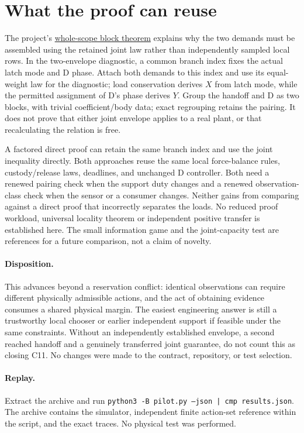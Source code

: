 \documentclass[11pt]{article}
\begin{document}
\section{What the proof can reuse}
The project’s \href{https://github.com/eternal-november/eos-research-programmes/blob/e1348964f73704212d2d8b48d5982a5ed600a2ff/projects/contextual-composition/foundations/shared-world-native-assembly/Whole_Scope_Block_Decomposition.tex\#L47-L60}{whole-scope block theorem} explains why the two demands must be assembled using the retained joint law rather than independently sampled local rows. In the two-envelope diagnostic, a common branch index fixes the actual latch mode and D phase. Attach both demands to this index and use its equal-weight law for the diagnostic; load conservation derives \(X\) from latch mode, while the permitted assignment of D's phase derives \(Y\). Group the handoff and D as two blocks, with trivial coefficient/body data; exact regrouping retains the pairing. It does not prove that either joint envelope applies to a real plant, or that recalculating the relation is free.

A factored direct proof can retain the same branch index and use the joint inequality directly. Both approaches reuse the same local force-balance rules, custody/release laws, deadlines, and unchanged D controller. Both need a renewed pairing check when the support duty changes and a renewed observation-class check when the sensor or a consumer changes. Neither gains from comparing against a direct proof that incorrectly separates the loads. No reduced proof workload, universal locality theorem or independent positive transfer is established here. The small information game and the joint-capacity test are references for a future comparison, not a claim of novelty.

\paragraph{Disposition.} This advances beyond a reservation conflict: identical observations can require different physically admissible actions, and the act of obtaining evidence consumes a shared physical margin. The easiest engineering answer is still a trustworthy local chooser or earlier independent support if feasible under the same constraints. Without an independently established envelope, a second reached handoff and a genuinely transferred joint guarantee, do not count this as closing C11. No changes were made to the contract, repository, or test selection.

\paragraph{Replay.} Extract the archive and run \texttt{python3 -B pilot.py --json | cmp results.json}. The archive contains the simulator, independent finite action-set reference within the script, and the exact traces. No physical test was performed.
\end{document}
